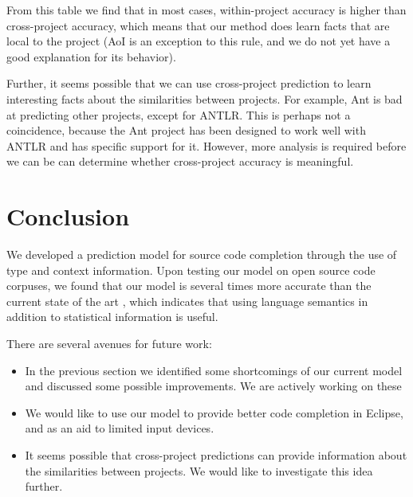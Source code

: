 \documentclass{article} %
\begin{document}
From this table we find that in most cases, within-project accuracy is higher than cross-project accuracy, which means that our method does learn facts that are local to the project (AoI is an exception to this rule, and we do not yet have a good explanation for its behavior).

Further, it seems possible that we can use cross-project prediction to learn interesting facts about the similarities between projects. For example, Ant is bad at predicting other projects, except for ANTLR. This is perhaps not a coincidence, because the Ant project has been designed to work well with ANTLR and has specific support for it. However, more analysis is required before we can be can determine whether cross-project accuracy is meaningful.


\section*{Conclusion}

We developed a prediction model for source code completion through the use of type and context information. Upon testing our model on open source code corpuses, we found that our model is several times more accurate than the current state of the art \cite{Hindle:2012:NS:2337223.2337322}, which indicates that using language semantics in addition to statistical information is useful.

There are several avenues for future work:
\begin{itemize}
  \item In the previous section we identified some shortcomings of our current model and discussed some possible improvements. We are actively working on these
  \item We would like to use our model to provide better code completion in Eclipse, and as an aid to limited input devices.
  \item It seems possible that cross-project predictions can provide information about the similarities between projects. We would like to investigate this idea further.
\end{itemize}



\end{document}
